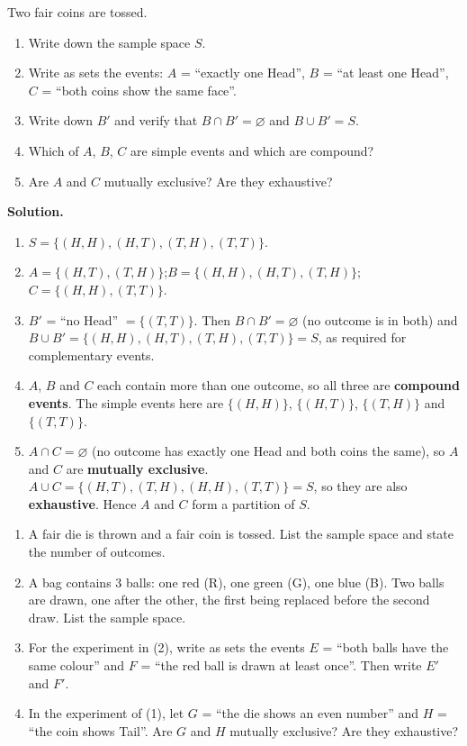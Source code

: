 \documentclass[11pt]{article}
\begin{document}
\begin{exoresolu}
Two fair coins are tossed.
\begin{enumerate}
\item Write down the sample space $S$.
\item Write as sets the events: $A$ = ``exactly one Head'', $B$ = ``at least one Head'', $C$ = ``both coins show the same face''.
\item Write down $B'$ and verify that $B \cap B' = \varnothing$ and $B \cup B' = S$.
\item Which of $A$, $B$, $C$ are simple events and which are compound?
\item Are $A$ and $C$ mutually exclusive? Are they exhaustive?
\end{enumerate}
\tcblower
\textbf{Solution.}
\begin{enumerate}
\item $S = \{(H,H), (H,T), (T,H), (T,T)\}$.
\item $A = \{(H,T), (T,H)\}$;\quad $B = \{(H,H), (H,T), (T,H)\}$;\quad $C = \{(H,H), (T,T)\}$.
\item $B'$ = ``no Head'' $= \{(T,T)\}$. Then $B \cap B' = \varnothing$ (no outcome is in both) and $B \cup B' = \{(H,H),(H,T),(T,H),(T,T)\} = S$, as required for complementary events.
\item $A$, $B$ and $C$ each contain more than one outcome, so all three are \textbf{compound events}. The simple events here are $\{(H,H)\}$, $\{(H,T)\}$, $\{(T,H)\}$ and $\{(T,T)\}$.
\item $A \cap C = \varnothing$ (no outcome has exactly one Head and both coins the same), so $A$ and $C$ are \textbf{mutually exclusive}. $A \cup C = \{(H,T),(T,H),(H,H),(T,T)\} = S$, so they are also \textbf{exhaustive}. Hence $A$ and $C$ form a partition of $S$.
\end{enumerate}
\end{exoresolu}

\begin{exercice}
\begin{enumerate}
\item A fair die is thrown and a fair coin is tossed. List the sample space and state the number of outcomes.
\item A bag contains 3 balls: one red (R), one green (G), one blue (B). Two balls are drawn, one after the other, the first being replaced before the second draw. List the sample space.
\item For the experiment in (2), write as sets the events $E$ = ``both balls have the same colour'' and $F$ = ``the red ball is drawn at least once''. Then write $E'$ and $F'$.
\item In the experiment of (1), let $G$ = ``the die shows an even number'' and $H$ = ``the coin shows Tail''. Are $G$ and $H$ mutually exclusive? Are they exhaustive?
\end{enumerate}
\end{exercice}
\end{document}

